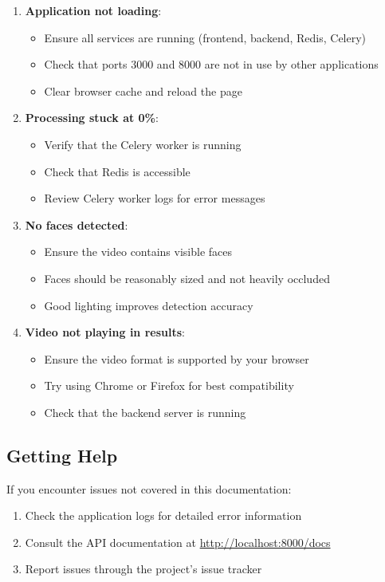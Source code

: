 \begin{enumerate}
    \item \textbf{Application not loading}:
    \begin{itemize}
        \item Ensure all services are running (frontend, backend, Redis, Celery)
        \item Check that ports 3000 and 8000 are not in use by other applications
        \item Clear browser cache and reload the page
    \end{itemize}

    \item \textbf{Processing stuck at 0\%}:
    \begin{itemize}
        \item Verify that the Celery worker is running
        \item Check that Redis is accessible
        \item Review Celery worker logs for error messages
    \end{itemize}

    \item \textbf{No faces detected}:
    \begin{itemize}
        \item Ensure the video contains visible faces
        \item Faces should be reasonably sized and not heavily occluded
        \item Good lighting improves detection accuracy
    \end{itemize}

    \item \textbf{Video not playing in results}:
    \begin{itemize}
        \item Ensure the video format is supported by your browser
        \item Try using Chrome or Firefox for best compatibility
        \item Check that the backend server is running
    \end{itemize}
\end{enumerate}

\subsection{Getting Help}

If you encounter issues not covered in this documentation:

\begin{enumerate}
    \item Check the application logs for detailed error information
    \item Consult the API documentation at \url{http://localhost:8000/docs}
    \item Report issues through the project's issue tracker
\end{enumerate}

